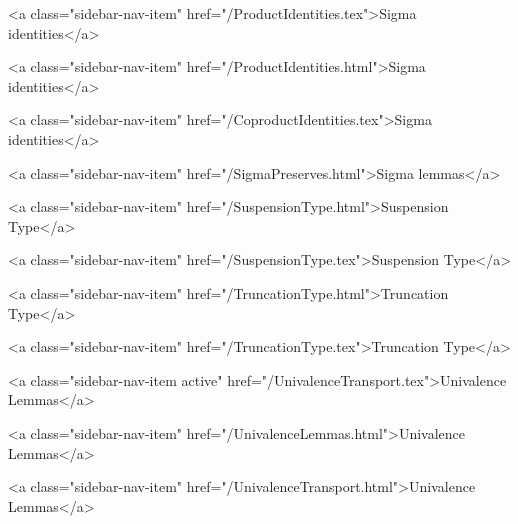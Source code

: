       
    
      
        
          <a class="sidebar-nav-item" href="/ProductIdentities.tex">Sigma identities</a>
        
      
    
      
        
          <a class="sidebar-nav-item" href="/ProductIdentities.html">Sigma identities</a>
        
      
    
      
        
          <a class="sidebar-nav-item" href="/CoproductIdentities.tex">Sigma identities</a>
        
      
    
      
        
          <a class="sidebar-nav-item" href="/SigmaPreserves.html">Sigma lemmas</a>
        
      
    
      
        
          <a class="sidebar-nav-item" href="/SuspensionType.html">Suspension Type</a>
        
      
    
      
        
          <a class="sidebar-nav-item" href="/SuspensionType.tex">Suspension Type</a>
        
      
    
      
        
          <a class="sidebar-nav-item" href="/TruncationType.html">Truncation Type</a>
        
      
    
      
        
          <a class="sidebar-nav-item" href="/TruncationType.tex">Truncation Type</a>
        
      
    
      
        
          <a class="sidebar-nav-item active" href="/UnivalenceTransport.tex">Univalence Lemmas</a>
        
      
    
      
        
          <a class="sidebar-nav-item" href="/UnivalenceLemmas.html">Univalence Lemmas</a>
        
      
    
      
        
          <a class="sidebar-nav-item" href="/UnivalenceTransport.html">Univalence Lemmas</a>
        
